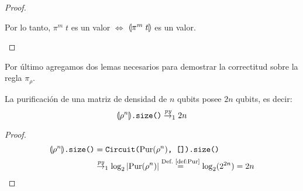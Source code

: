 \begin{proof}
\begin{itemize}
Por lo tanto, $\pi^m\;t$ es un valor $\Leftrightarrow$ $\llparenthesis \pi^m\;t \rrparenthesis$ es un valor.
     
\end{itemize}
\end{proof}
Por último agregamos dos lemas necesarios para demostrar la correctitud sobre la regla $\pi_\rho$.
\begin{lema}\label{lem:rhosize}
La purificación de una matriz de densidad de $n$ qubits posee $2n$ qubits, es decir:
    \[\texttt{\ensuremath{\llparenthesis \rho^n \rrparenthesis}.size()} \overset{\textit{py}}{\rightarrow}_1 2n\]
\end{lema}
\begin{proof}
    \begin{align*}
        \texttt{\ensuremath{\llparenthesis \rho^n \rrparenthesis}.size()} &= \texttt{Circuit(}\text{Pur}(\rho^n)\texttt{, []).size()} \\
        &\overset{\textit{py}}{\rightarrow}_1 \log_2|\text{Pur}(\rho^n)| \stackrel{\textrm{Def.~\ref{def:Pur}}}{=} \log_2(2^{2n}) = 2n
    \end{align*}
\end{proof}


